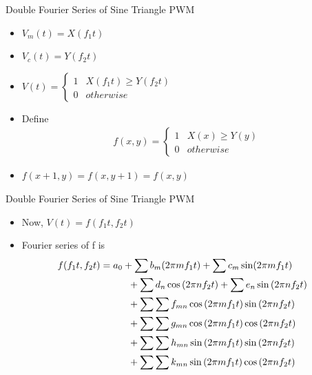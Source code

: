 \documentclass{beamer}
\begin{document}
\begin{frame}{Double Fourier Series of Sine Triangle PWM}
    \begin{itemize}
        \item $V_m(t) = X(f_1t)$
        \item $V_c(t) = Y(f_2t)$
        \item $V(t) = \begin{cases}
            1&X(f_1t) \geq Y(f_2t)\\
            0& otherwise
        \end{cases}$
        \item Define
        \begin{align*}
            f(x,y) = \begin{cases}
                1&X(x) \geq Y(y)\\
                0& otherwise
            \end{cases}
        \end{align*}
        \item $f(x+1,y) = f(x,y+1) = f(x,y)$ 
    \end{itemize}
\end{frame}

\begin{frame}{Double Fourier Series of Sine Triangle PWM}
    \begin{itemize}
        \item Now, $V(t) = f(f_1t, f_2t)$
        \item Fourier series of f is
        \begin{align*}
            f(f_1t,f_2t) = a_{0}+ \sum b_{m}(2\pi mf_1t)+\sum c_{m}\sin(2\pi mf_1t)\\
            &\hspace{-17em} +\sum d_{n}\cos\left(2\pi nf_2t\right)+\sum e_{n}\sin\left(2\pi nf_2t\right)\\
            &\hspace{-17em} +\sum\sum f_{mn}\cos\left(2\pi mf_1t\right)\sin\left(2\pi nf_2t\right)\\
            &\hspace{-17em} +\sum\sum g_{mn}\cos\left(2\pi mf_1t\right)\cos\left(2\pi nf_2t\right)\\
            &\hspace{-17em} +\sum\sum h_{mn}\sin\left(2\pi mf_1t\right)\sin\left(2\pi nf_2t\right)\\
            &\hspace{-17em} +\sum\sum k_{mn}\sin\left(2\pi mf_1t\right)\cos\left(2\pi nf_2t\right)
        \end{align*}
    \end{itemize}
\end{frame}
\end{document}
